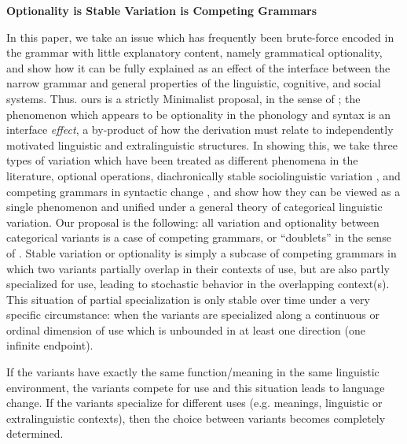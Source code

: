\documentclass[a4paper,aps,prl,12pt,tightenlines,superscriptaddress]{revtex4}
\title{}%
\begin{document}
\begin{center} \textbf{Optionality is Stable Variation is Competing Grammars}  \end{center}


\noindent In this paper, we take an issue which has frequently been brute-force encoded in the grammar with little explanatory content, namely grammatical optionality, and show how it can be fully explained as an effect of the interface between the narrow grammar and general properties of the linguistic, cognitive, and social systems. Thus. ours is a strictly Minimalist proposal, in the sense of \citep[][inter alia]{chomsky1993, chomsky2001}; the phenomenon which appears to be optionality in the phonology and syntax is an interface \textsl{effect}, a by-product of how the derivation must relate to independently motivated linguistic and extralinguistic structures. In showing this, we take three types of variation which have been treated as different phenomena in the literature, optional operations, diachronically stable sociolinguistic variation \citep[e.g.][]{labov1989}, and competing grammars in syntactic change \citep[][]{kroch1989}, and show how they can be viewed as a single phenomenon and unified under a general theory of categorical linguistic variation. Our proposal is the following: all variation and optionality between categorical variants is a case of competing grammars, or ``doublets'' in the sense of \citet{kroch1994}. Stable variation or optionality is simply a subcase of competing grammars in which two variants partially overlap in their contexts of use, but are also partly specialized for use, leading to stochastic behavior in the overlapping context(s). This situation of partial specialization is only stable over time under a very specific circumstance: when the variants are specialized along a continuous or ordinal dimension of use which is unbounded in at least one direction (one infinite endpoint).

If the variants have exactly the same function/meaning in the same linguistic environment, the variants compete for use and this situation leads to language change. If the variants specialize for different uses (e.g. meanings, linguistic or extralinguistic contexts), then the choice between variants becomes completely determined.
\end{document}
